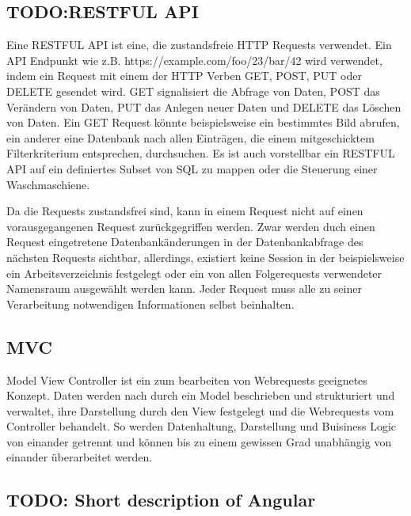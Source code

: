 \subsection{TODO:RESTFUL API} Eine RESTFUL API ist eine, die
zustandsfreie HTTP Requests verwendet. Ein API
Endpunkt wie
z.B. https://example.com/foo/23/bar/42 wird verwendet, indem ein
Request mit einem der HTTP Verben GET, POST, PUT oder DELETE gesendet
wird.  GET signalisiert die Abfrage von Daten, POST das Verändern von
Daten, PUT das Anlegen neuer Daten und DELETE das Löschen von
Daten. Ein GET Request könnte beispielsweise ein bestimmtes Bild
abrufen, ein anderer eine Datenbank nach allen Einträgen, die einem
mitgeschicktem Filterkriterium entsprechen, durchsuchen. Es ist auch
vorstellbar ein RESTFUL API auf ein definiertes Subset von SQL zu
mappen oder die Steuerung einer Waschmaschiene.

Da die Requests zustandsfrei sind, kann in einem Request nicht auf
einen vorausgegangenen Request zurückgegriffen werden. Zwar werden
duch einen Request eingetretene Datenbankänderungen in der
Datenbankabfrage des nächsten Requests sichtbar, allerdings, existiert
keine Session in der beispielsweise ein Arbeitsverzeichnis festgelegt
oder ein von allen Folgerequests verwendeter Namensraum ausgewählt
werden kann. Jeder Request muss alle zu seiner Verarbeitung
notwendigen Informationen selbst beinhalten.

\subsection{MVC}
Model View Controller ist ein zum bearbeiten von Webrequests geeignetes Konzept.
Daten werden nach durch ein Model beschrieben und strukturiert und verwaltet,
ihre Darstellung durch den View festgelegt und die Webrequests vom Controller
behandelt. So werden Datenhaltung, Darstellung und Buisiness Logic von einander
getrennt und können bis zu einem gewissen Grad unabhängig von einander
überarbeitet werden.


\subsection{TODO: Short description of Angular}

\todo{}



